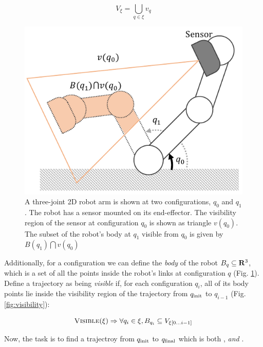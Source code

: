 \documentclass[conference]{IEEEtran}
\begin{document}
\begin{equation}
V_\xi= \bigcup_{q \in \xi} v_q 
\end{equation}

\begin{figure}
	\includegraphics[width=1.0\columnwidth]{img/robot_visible.pdf}
	\caption{A three-joint 2D robot arm is shown at two configurations, $q_0$ and
	$q_1$. The robot has a sensor mounted on its end-effector. The visibility
	region of the sensor at configuration $q_0$ is shown as triangle $v(q_0)$. The
	subset of the robot's body at $q_1$ visible from $q_0$ is given by $B(q_1)
	\bigcap v(q_0)$}
	\label{fig:robot_visible}
\end{figure}

Additionally, for a configuration we can define the \textit{body} of the robot
$B_q \subseteq \mathbf{R}^3$, which is a set of all the points inside the robot's
links at configuration $q$ (Fig. \ref{fig:robot_visible}).  Define a trajectory
as being \textit{visible} if, for each configuration $q_i$, all of its body
points lie inside the visibility region of the trajectory from $q_{\text{init}}$ to
$q_{i - 1}$ (Fig. \ref{fig:visibility}):

\begin{equation}
\textsc{Visible}(\xi) \Rightarrow \forall q_i \in \xi, B_{q_i} \subseteq
V_{\xi[0\ldots i - 1]}
\end{equation}

Now, the task is to find a trajectroy from $q_{\text{init}}$ to $q_{\text{final}}$ which is both
\cfree, \emph{and}  \vis.
\end{document}
